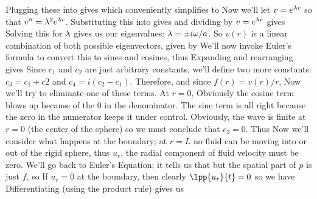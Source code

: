 \documentclass[12pt]{book}
\begin{document}
{Plugging these into  gives
which conveniently simplifies to
Now we'll let $v=e^{\lambda r}$ so that $v'' = \lambda^2e^{\lambda r}$. Substituting this into  gives
and dividing by $v=e^{\lambda r}$ gives
Solving this for $\lambda$ gives us our eigenvalues: $\lambda = \pm i\omega/a$.  So $v(r)$ is a linear combination of both possible eigenvectors, given by
 We'll now invoke Euler's formula to convert this to sines and cosines, thus
Expanding and rearranging gives
Since $c_1$ and $c_2$ are just arbitrary constants, we'll define two more constants: $c_3=c_1+c2$ and $c_4 = i(c_2 - c_1)$. Therefore,
and since $f(r) = v(r)/r$, 
Now we'll try to eliminate one of these terms.  At $r=0$,
Obviously the cosine term blows up because of the $0$ in the denominator.  The sine term is all right because the zero in the numerator keeps it under control.  Obviously, the wave is finite at $r=0$ (the center of the sphere) so we must conclude that $c_3 = 0$.  Thus
Now we'll consider what happens at the boundary; at $r=L$ no fluid can be moving into or out of the rigid sphere, thus $u_r$, the radial component of fluid velocity must be zero.  We'll go back to Euler's Equation; it tells us that
but the spatial part of $p$ is just $f$, so
If $u_r = 0$ at the boundary, then clearly $\lpp{u_r}{t} = 0$ so we have
Differentiating  (using the product rule) gives us
}
\end{document}
